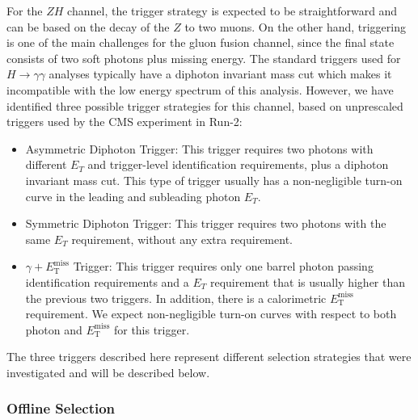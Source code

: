 \documentclass[11pt]{article}
\newcommand{\MET}{\ensuremath{E_{\mathrm{T}}^{\mathrm{miss}}}\xspace}
\begin{document}
For the $ZH$ channel, the trigger strategy is expected to be straightforward and can be based on the decay of the $Z$ to two muons.
%
%
On the other hand, triggering is one of the main challenges for the gluon fusion channel, since the final state consists of two soft photons plus missing energy. The standard triggers used for $H\rightarrow\gamma\gamma$ analyses typically have a diphoton invariant mass cut which makes it incompatible with the low energy spectrum of this analysis. However, we have identified three possible trigger strategies for this channel, based on  unprescaled triggers used by the CMS experiment in Run-2:

\begin{itemize}
\item Asymmetric Diphoton Trigger: This trigger requires two photons with different $E_{T}$ and trigger-level identification requirements, plus a diphoton invariant mass cut. This type of trigger usually has a non-negligible turn-on curve in the leading and subleading photon  $E_{T}$.
\item Symmetric Diphoton Trigger: This trigger requires two photons with the same $E_{T}$ requirement, without any extra requirement.
\item $\gamma+\MET$ Trigger: This trigger requires only one barrel photon passing identification requirements and a $E_{T}$ requirement that is usually higher than the previous two triggers. In addition, there is a calorimetric \MET requirement. We expect non-negligible turn-on curves with respect to both photon and \MET for this trigger.
\end{itemize}

The three triggers described here represent different selection strategies that were investigated and will be described below.


\subsubsection{Offline Selection}
\end{document}
